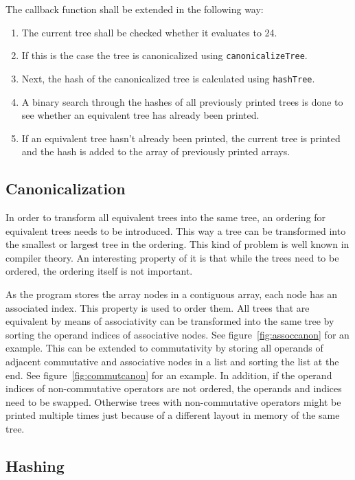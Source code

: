 \documentclass[11pt,a4paper]{article}
\newcommand{\code}[1]{\texttt{#1}}
\begin{document}
The callback function shall be extended in the following way:
\begin{enumerate}
\item The current tree shall be checked whether it evaluates to 24.
\item If this is the case the tree is canonicalized using
  \code{canonicalizeTree}.
\item Next, the hash of the canonicalized tree is calculated using
  \code{hashTree}.
\item A binary search through the hashes of all previously printed
  trees is done to see whether an equivalent tree has already been
  printed.
\item If an equivalent tree hasn't already been printed, the current tree
  is printed and the hash is added to the array of previously printed
  arrays.
\end{enumerate}

\subsection{Canonicalization}

In order to transform all equivalent trees into the same tree, an
ordering for equivalent trees needs to be introduced.
This way a tree can be transformed into the smallest or largest tree
in the ordering.
This kind of problem is well known in compiler theory.
An interesting property of it is that while the trees need to be ordered, 
the ordering itself is not important.

As the program stores the array nodes in a contiguous array, each node
has an associated index. This property is used to order them.
All trees that are equivalent by means of associativity can be transformed
into the same tree by sorting the operand indices of associative nodes.
See figure~\ref{fig:assoccanon} for an example.
This can be extended to commutativity by storing all operands of
adjacent commutative and associative nodes in a list and sorting the
list at the end.
See figure~\ref{fig:commutcanon} for an example.
In addition, if the operand indices of non-commutative operators are
not ordered, the operands and indices need to be swapped.
Otherwise trees with non-commutative operators might be printed
multiple times just because of a different layout in memory of the
same tree.

\subsection{Hashing}
\end{document}
